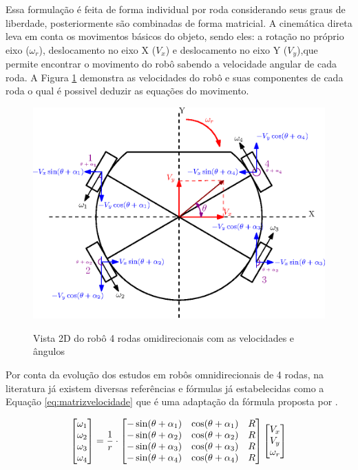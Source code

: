 \documentclass[deposito, acronym, symbols]{fei}
\begin{document}
Essa formulação é feita de forma individual por roda considerando seus graus de liberdade, posteriormente são combinadas de forma matricial. A cinemática direta leva em conta os movimentos básicos do objeto, sendo eles: a rotação no próprio eixo ($\omega_r$), deslocamento no eixo X ($V_x$) e deslocamento no eixo Y ($V_y$),que permite encontrar o movimento do robô sabendo a velocidade angular de cada roda. A Figura \ref{fig:cin_clasica} demonstra as velocidades do robô e suas componentes de cada roda o qual é possivel deduzir as equações do movimento.

\begin{figure}[!htb]
    \centering
    \caption{Vista 2D do robô 4 rodas omidirecionais com as velocidades e ângulos}
    \includegraphics[scale=1]{Imagens/Omni_wheels_clasic.eps}
    \label{fig:cin_clasica}
\end{figure}

Por conta da evolução dos estudos em robôs omnidirecionais de 4 rodas, na literatura já existem  diversas referências e fórmulas já estabelecidas como a Equação \ref{eq:matrizvelocidade} que é uma adaptação da fórmula proposta por \textcite{rijalusalam2021implementation}.

\begin{equation} \label{eq:matrizvelocidade}
\centering  
\begin{bmatrix}\omega_1\\\omega_2\\\omega_3\\\omega_4\end{bmatrix} = \frac{1}{r} \cdot 
   \begin{bmatrix}-\sin(\theta+\alpha_1)&\cos(\theta+\alpha_1)&R\\-\sin(\theta+\alpha_2)&\cos(\theta+\alpha_2)&R\\-\sin(\theta+\alpha_3)&\cos(\theta+\alpha_3)&R\\-\sin(\theta+\alpha_4)&\cos(\theta+\alpha_4)&R \end{bmatrix}
   \begin{bmatrix}V_x\\V_y\\\omega_r\end{bmatrix}  
\end{equation}
\end{document}
